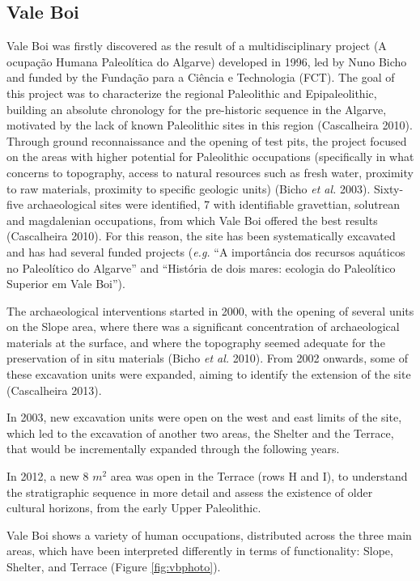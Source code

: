 \documentclass[12pt,twoside]{reedthesis}
\begin{document}
\hypertarget{vale-boi-1}{%
\subsection{Vale Boi}\label{vale-boi-1}}

Vale Boi was firstly discovered as the result of a multidisciplinary project (A ocupação Humana Paleolítica do Algarve) developed in 1996, led by Nuno Bicho and funded by the Fundação para a Ciência e Technologia (FCT). The goal of this project was to characterize the regional Paleolithic and Epipaleolithic, building an absolute chronology for the pre-historic sequence in the Algarve, motivated by the lack of known Paleolithic sites in this region (Cascalheira 2010). Through ground reconnaissance and the opening of test pits, the project focused on the areas with higher potential for Paleolithic occupations (specifically in what concerns to topography, access to natural resources such as fresh water, proximity to raw materials, proximity to specific geologic units) (Bicho \emph{et al.} 2003). Sixty-five archaeological sites were identified, 7 with identifiable gravettian, solutrean and magdalenian occupations, from which Vale Boi offered the best results (Cascalheira 2010). For this reason, the site has been systematically excavated and has had several funded projects (\emph{e.g.} ``A importância dos recursos aquáticos no Paleolítico do Algarve'' and ``História de dois mares: ecologia do Paleolítico Superior em Vale Boi'').

The archaeological interventions started in 2000, with the opening of several units on the Slope area, where there was a significant concentration of archaeological materials at the surface, and where the topography seemed adequate for the preservation of in situ materials (Bicho \emph{et al.} 2010). From 2002 onwards, some of these excavation units were expanded, aiming to identify the extension of the site (Cascalheira 2013).

In 2003, new excavation units were open on the west and east limits of the site, which led to the excavation of another two areas, the Shelter and the Terrace, that would be incrementally expanded through the following years.

In 2012, a new 8 \(m^2\) area was open in the Terrace (rows H and I), to understand the stratigraphic sequence in more detail and assess the existence of older cultural horizons, from the early Upper Paleolithic.

Vale Boi shows a variety of human occupations, distributed across the three main areas, which have been interpreted differently in terms of functionality: Slope, Shelter, and Terrace (Figure \ref{fig:vbphoto}).
\end{document}
